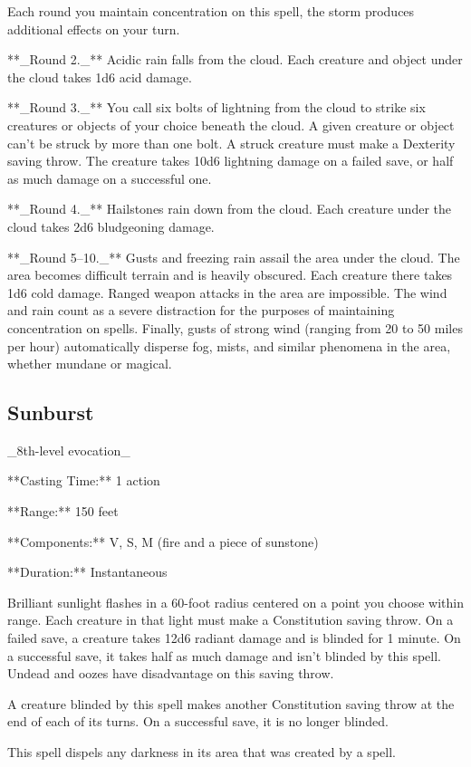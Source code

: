 Each round you maintain concentration on this spell, the storm produces additional effects on your turn.

**_Round 2._** Acidic rain falls from the cloud. Each creature and object under the cloud takes 1d6 acid damage.

**_Round 3._** You call six bolts of lightning from the cloud to strike six creatures or objects of your choice beneath the cloud. A given creature or object can’t be struck by more than one bolt. A struck creature must make a Dexterity saving throw. The creature takes 10d6 lightning damage on a failed save, or half as much damage on a successful one.

**_Round 4._** Hailstones rain down from the cloud. Each creature under the cloud takes 2d6 bludgeoning damage.

**_Round 5–10._** Gusts and freezing rain assail the area under the cloud. The area becomes difficult terrain and is heavily obscured. Each creature there takes 1d6 cold damage. Ranged weapon attacks in the area are impossible. The wind and rain count as a severe distraction for the purposes of maintaining concentration on spells. Finally, gusts of strong wind (ranging from 20 to 50 miles per hour) automatically disperse fog, mists, and similar phenomena in the area, whether mundane or magical.

\subsection{Sunburst}

_8th-level evocation_

**Casting Time:** 1 action

**Range:** 150 feet

**Components:** V, S, M (fire and a piece of sunstone)

**Duration:** Instantaneous

Brilliant sunlight flashes in a 60-foot radius centered on a point you choose within range. Each creature in that light must make a Constitution saving throw. On a failed save, a creature takes 12d6 radiant damage and is blinded for 1 minute. On a successful save, it takes half as much damage and isn’t blinded by this spell. Undead and oozes have disadvantage on this saving throw.

A creature blinded by this spell makes another Constitution saving throw at the end of each of its turns. On a successful save, it is no longer blinded.

This spell dispels any darkness in its area that was created by a spell.

